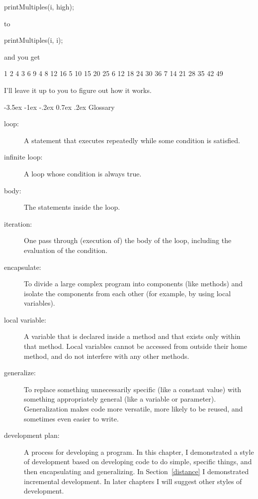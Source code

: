 \documentclass{book}
\makeatletter
\renewcommand{\section}{\@startsection 
    {section} {1} {0mm}%
    {-3.5ex \@plus -1ex \@minus -.2ex}%
    {0.7ex \@plus.2ex}%
    {\normalfont\Large\bfseries}}
\makeatother
\begin{document}
\begin{verbatimtab}
      printMultiples(i, high);
\end{verbatimtab}
%
to

\begin{verbatimtab}
      printMultiples(i, i);
\end{verbatimtab}
%
and you get

\begin{verbatimtab}
1   
2   4   
3   6   9   
4   8   12   16   
5   10   15   20   25   
6   12   18   24   30   36   
7   14   21   28   35   42   49  
\end{verbatimtab}
%
I'll leave it up to you to figure out how it works.


\section{Glossary}

\begin{description}

\item[loop:]  A statement that executes repeatedly while
some condition is satisfied.

\item[infinite loop:]  A loop whose condition is always true.

\item[body:]  The statements inside the loop.

\item[iteration:]  One pass through (execution of) the body
of the loop, including the evaluation of the condition.

\item[encapsulate:]  To divide a large complex program into
components (like methods) and isolate the components from
each other (for example, by using local variables).

\item[local variable:]  A variable that is declared inside
a method and that exists only within that method.  Local variables
cannot be accessed from outside their home method, and do not
interfere with any other methods.

\item[generalize:]  To replace something unnecessarily specific
(like a constant value) with something appropriately general
(like a variable or parameter).  Generalization makes code more
versatile, more likely to be reused, and sometimes even easier
to write.

\item[development plan:] A process for developing a program.  In this
  chapter, I demonstrated a style of development based on developing
  code to do simple, specific things, and then encapsulating and
  generalizing.  In Section~\ref{distance} I demonstrated incremental
  development.  In later chapters I will suggest other styles of
  development.


\end{description}
\end{document}

